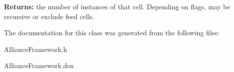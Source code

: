 {\bfseries Returns\+:} the number of instances of that cell. Depending on {\ttfamily flags}, may be recursive or exclude feed cells. 

The documentation for this class was generated from the following files\+:\begin{DoxyCompactItemize}
\item 
Alliance\+Framework.\+h\item 
Alliance\+Framework.\+dox\end{DoxyCompactItemize}
